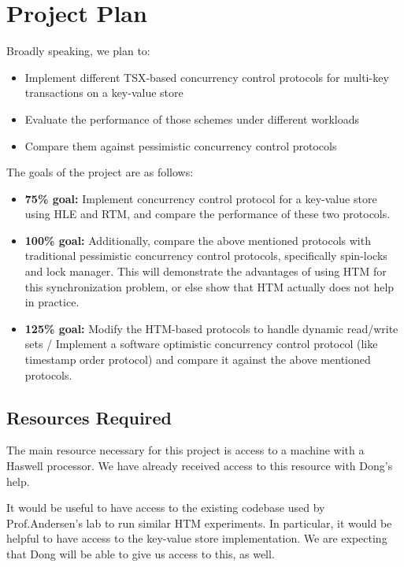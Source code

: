 \section{Project Plan} \label{sec:plan}

Broadly speaking, we plan to:
\begin{itemize}
\item Implement different TSX-based concurrency control protocols for
    multi-key transactions on a key-value store
\item Evaluate the performance of those schemes under different workloads
\item Compare them against pessimistic concurrency control protocols
\end{itemize}

The goals of the project are as follows:
\begin{itemize}
\item \textbf{75\% goal:} Implement concurrency control protocol for a key-value
        store using HLE and RTM, and compare the performance of these two
        protocols.
\item \textbf{100\% goal:} Additionally, compare the above mentioned protocols with
        traditional pessimistic concurrency control protocols, specifically
        spin-locks and lock manager. This will demonstrate the advantages of
        using HTM for this synchronization problem, or else show that 
        HTM actually does not help in practice.
\item \textbf{125\% goal:} Modify the HTM-based protocols to handle dynamic
        read/write sets / Implement a software optimistic concurrency control 
        protocol (like timestamp order protocol) and compare it against the 
        above mentioned protocols. 
\end{itemize}

\subsection{Resources Required}
The main resource necessary for this project is access to a machine
with a Haswell processor. We have already received access to this
resource with Dong's help.

It would be useful to have access to the existing codebase used by Prof.Andersen's lab to run similar HTM experiments. In particular, it would be helpful to have access to the key-value store implementation. We are expecting that Dong will be able to give us access to this, as well.

